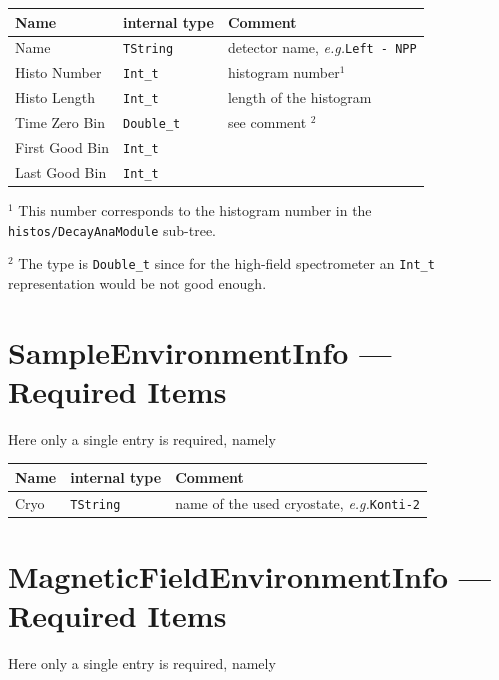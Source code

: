 \documentclass[twoside]{article}
\newcommand{\eg}{\emph{e.g.}\xspace}
\newcommand{\tstring}{\texttt{TString}\xspace}
\begin{document}
\begin{tabular}{l|l|l}
Name           & internal type   & Comment \\ \hline\hline
Name           & \tstring        & detector name, \eg \texttt{Left - NPP} \\
Histo Number   & \verb!Int_t!    & histogram number$^1$ \\
Histo Length   & \verb!Int_t!    & length of the histogram \\
Time Zero Bin  & \verb!Double_t! & see comment $^2$ \\
First Good Bin & \verb!Int_t!    & \\
Last Good Bin  & \verb!Int_t!    & \\
\end{tabular}

\vspace{2mm}

\begin{small}
\noindent $^1$ This number corresponds to the histogram number in the \verb!histos/DecayAnaModule! sub-tree.

\noindent $^2$ The type is \verb!Double_t! since for the high-field spectrometer an \verb!Int_t! representation would be not good enough.
\end{small}

\section{SampleEnvironmentInfo --- Required Items} \label{sec:SampleEnvironmentInfoRequired}

Here only a single entry is required, namely 

\vspace{2mm}

\begin{tabular}{l|l|l}
Name           & internal type   & Comment \\ \hline\hline
Cryo           & \tstring        & name of the used cryostate, \eg \texttt{Konti-2} \\
\end{tabular}


\section{MagneticFieldEnvironmentInfo --- Required Items} \label{sec:MagneticFieldEnvironmentInfoRequired}

Here only a single entry is required, namely 
\end{document}
